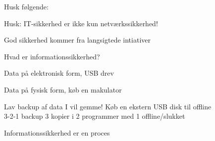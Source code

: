 \documentclass[18pt,landscape,a4paper,footrule]{foils}
\begin{document}
\begin{list1}
\item Husk følgende:
\begin{list2}
\item Husk: IT-sikkerhed er ikke kun netværkssikkerhed!
\item God sikkerhed kommer fra langsigtede intiativer
\item Hvad er informationssikkerhed?
\item Data på elektronisk form, USB drev
\item Data på fysisk form, køb en makulator
\item Lav backup af data I vil gemme! Køb en ekstern USB disk til offline\\
3-2-1 backup 3 kopier i 2 programmer med 1 offline/slukket
\end{list2}
\end{list1}
\vskip 1cm
\centerline{\color{titlecolor}\LARGE Informationssikkerhed er en proces}

\myquestionspage
\end{document}

